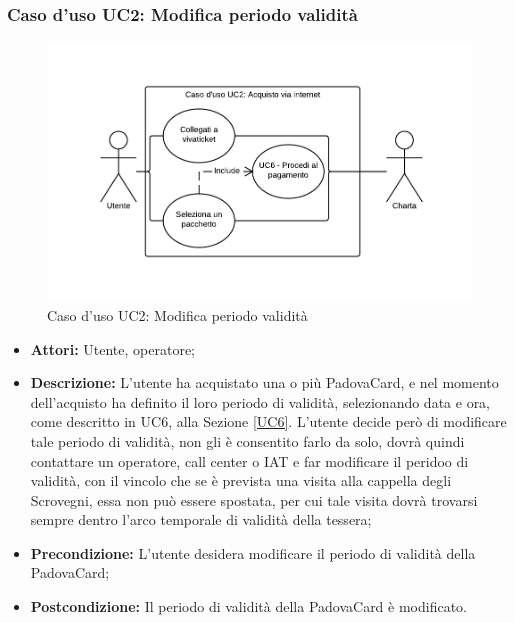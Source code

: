 \subsubsection{Caso d'uso UC2: Modifica periodo validità}
\begin{figure}[H]
\centering
\includegraphics[width=1\textwidth]{images/UC2.png}
\caption{Caso d'uso UC2: Modifica periodo validità}
\end{figure}
\begin{itemize}
\item \textbf{Attori:} Utente, operatore;
\item \textbf{Descrizione:} L'utente ha acquistato una o più PadovaCard, e nel momento dell'acquisto ha definito il loro periodo di validità, selezionando data e ora, come descritto in UC6, alla Sezione \ref{UC6}. L'utente decide però di modificare tale periodo di validità, non gli è consentito farlo da solo, dovrà quindi contattare un operatore, call center o IAT e far modificare il peridoo di validità, con il vincolo che se è prevista una visita alla cappella degli Scrovegni, essa non può essere spostata, per cui tale visita dovrà trovarsi sempre dentro l'arco temporale di validità della tessera;
\item \textbf{Precondizione:} L'utente desidera modificare il periodo di validità della PadovaCard;
\item \textbf{Postcondizione:}  Il periodo di validità della PadovaCard è modificato.
\end{itemize}


